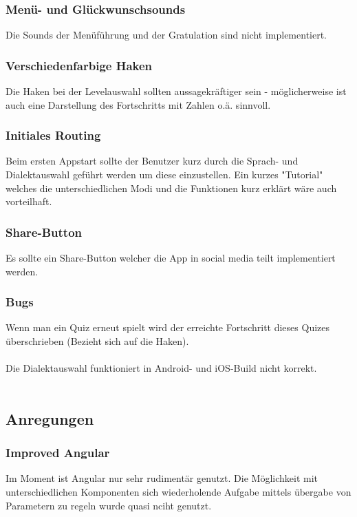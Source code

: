 \subsubsection*{Menü- und Glückwunschsounds}
Die Sounds der Menüführung und der Gratulation sind nicht implementiert.

\subsubsection*{Verschiedenfarbige Haken}
Die Haken bei der Levelauswahl sollten aussagekräftiger sein - möglicherweise ist auch eine Darstellung des Fortschritts mit Zahlen o.ä. sinnvoll.

\subsubsection*{Initiales Routing}
Beim ersten Appstart sollte der Benutzer kurz durch die Sprach- und Dialektauswahl geführt werden um diese einzustellen. Ein kurzes "Tutorial" welches die unterschiedlichen Modi und die Funktionen kurz erklärt wäre auch vorteilhaft.

\subsubsection*{Share-Button}
Es sollte ein Share-Button welcher die App in social media teilt implementiert werden.

\subsubsection*{Bugs}
Wenn man ein Quiz erneut spielt wird der erreichte Fortschritt dieses Quizes überschrieben (Bezieht sich auf die Haken).\\\\
Die Dialektauswahl funktioniert in Android- und iOS-Build nicht korrekt.\\\\
\subsection{Anregungen}
\subsubsection*{Improved Angular}
Im Moment ist Angular nur sehr rudimentär genutzt. Die Möglichkeit mit unterschiedlichen Komponenten sich wiederholende Aufgabe mittels übergabe von Parametern zu regeln wurde quasi nciht genutzt. 

